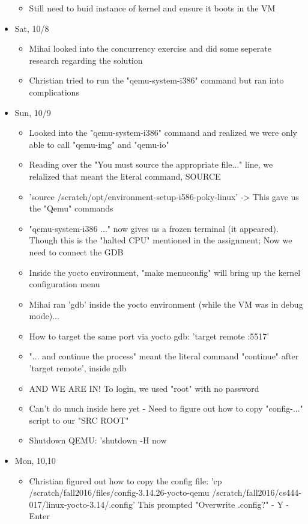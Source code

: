 \documentclass[letterpaper,10pt,onecolumn]{IEEEtran}
\begin{document}
\begin{itemize}
\begin{itemize}
    		\item Still need to buid instance of kernel and ensure it boots in the VM
    	\end{itemize}
    \item Sat, 10/8
        \begin{itemize} 
    		\item Mihai looked into the concurrency exercise and did some seperate research regarding the solution
    		\item Christian tried to run the "qemu-system-i386" command but ran into complications
    	\end{itemize}
    \item Sun, 10/9
        \begin{itemize} 
    		\item Looked into the "qemu-system-i386" command and realized we were only able to call "qemu-img" and "qemu-io"
    		\item Reading over the "You must source the appropriate file..." line, we relalized that meant the literal command, SOURCE
        	\item 'source /scratch/opt/environment-setup-i586-poky-linux'	->	This gave us the "Qemu" commands
    		\item "qemu-system-i386 ..." now gives us a frozen terminal (it appeared). Though this is the "halted CPU" mentioned in the assignment; Now we need to connect the GDB
    		\item Inside the yocto environment, "make menuconfig" will bring up the kernel configuration menu
    		\item Mihai ran 'gdb' inside the yocto environment (while the VM was in debug mode)...
    		\item How to target the same port via yocto gdb:  'target remote :5517'
    		\item "... and continue the process" meant the literal command "continue" after 'target remote', inside gdb
    		\item AND WE ARE IN! To login, we used "root" with no password
    		\item Can't do much inside here yet	-	Need to figure out how to copy "config-..." script to our "SRC ROOT"
    		\item Shutdown QEMU:  'shutdown -H now 
    	\end{itemize}
    \item Mon, 10,10
        \begin{itemize} 
    		\item Christian figured out how to copy the config file: 'cp /scratch/fall2016/files/config-3.14.26-yocto-qemu /scratch/fall2016/cs444-017/linux-yocto-3.14/.config' This prompted "Overwrite .config?"		-	Y	-	Enter

\end{itemize}
\end{itemize}
\end{document}
